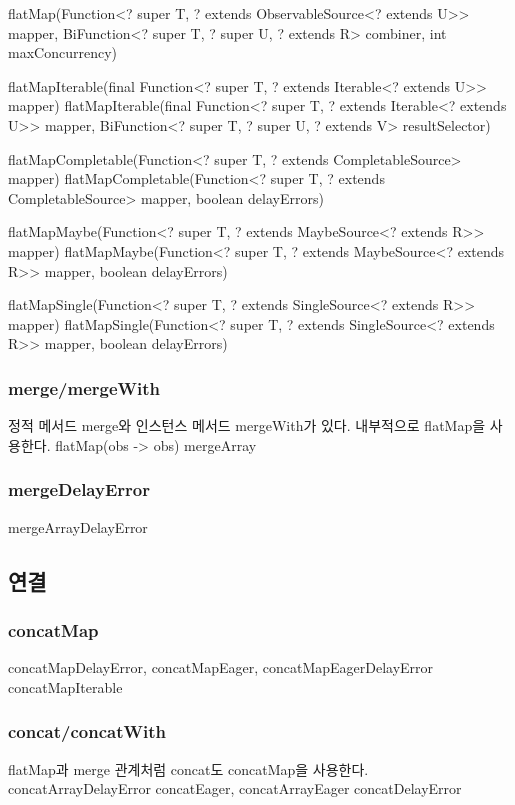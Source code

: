 \documentclass{book}
\begin{document}
{flatMap(Function<? super T, ? extends ObservableSource<? extends U>> mapper,
            BiFunction<? super T, ? super U, ? extends R> combiner, int maxConcurrency)

flatMapIterable(final Function<? super T, ? extends Iterable<? extends U>> mapper)
flatMapIterable(final Function<? super T, ? extends Iterable<? extends U>> mapper,
            BiFunction<? super T, ? super U, ? extends V> resultSelector)

flatMapCompletable(Function<? super T, ? extends CompletableSource> mapper)
flatMapCompletable(Function<? super T, ? extends CompletableSource> mapper, boolean delayErrors)


flatMapMaybe(Function<? super T, ? extends MaybeSource<? extends R>> mapper)
flatMapMaybe(Function<? super T, ? extends MaybeSource<? extends R>> mapper, boolean delayErrors)

flatMapSingle(Function<? super T, ? extends SingleSource<? extends R>> mapper)
flatMapSingle(Function<? super T, ? extends SingleSource<? extends R>> mapper, boolean delayErrors)
                                                                        
\subsubsection{merge/mergeWith}
정적 메서드 merge와 인스턴스 메서드 mergeWith가 있다.
내부적으로 flatMap을 사용한다.
flatMap(obs -> obs)
mergeArray



\subsubsection{mergeDelayError}
mergeArrayDelayError

\subsection{연결}
\subsubsection{concatMap}
concatMapDelayError, concatMapEager, concatMapEagerDelayError
concatMapIterable

\subsubsection{concat/concatWith}
flatMap과 merge 관계처럼 concat도 concatMap을 사용한다.
concatArrayDelayError
concatEager, concatArrayEager
concatDelayError

}
\end{document}
